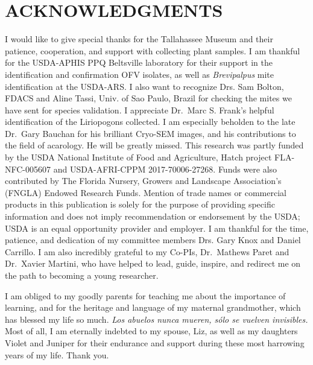 \documentclass{ufdissertation}[overrideChapters] %
\begin{document}

{\hypertarget{acknowledgments}{%
\chapter{ACKNOWLEDGMENTS}\label{acknowledgments}}

I would like to give special thanks for the Tallahassee Museum and their patience, cooperation, and support with collecting plant samples. I am thankful for the USDA-APHIS PPQ Beltsville laboratory for their support in the identification and confirmation OFV isolates, as well as \emph{Brevipalpus} mite identification at the USDA-ARS. I also want to recognize Drs. Sam Bolton, FDACS and Aline Tassi, Univ. of Sao Paulo, Brazil for checking the mites we have sent for species validation. I appreciate Dr.~Marc S. Frank's helpful identification of the Liriopogons collected. I am especially beholden to the late Dr.~Gary Bauchan for his brilliant Cryo-SEM images, and his contributions to the field of acarology. He will be greatly missed. This research was partly funded by the USDA National Institute of Food and Agriculture, Hatch project FLA-NFC-005607 and USDA-AFRI-CPPM 2017-70006-27268. Funds were also contributed by The Florida Nursery, Growers and Landscape Association's (FNGLA) Endowed Research Funds. Mention of trade names or commercial products in this publication is solely for the purpose of providing specific information and does not imply recommendation or endorsement by the USDA; USDA is an equal opportunity provider and employer. I am thankful for the time, patience, and dedication of my committee members Drs. Gary Knox and Daniel Carrillo. I am also incredibly grateful to my Co-PIs, Dr.~Mathews Paret and Dr.~Xavier Martini, who have helped to lead, guide, inspire, and redirect me on the path to becoming a young researcher.

I am obliged to my goodly parents for teaching me about the importance of learning, and for the heritage and language of my maternal grandmother, which has blessed my life so much. \emph{Los abuelos nunca mueren, sólo se vuelven invisibles.} Most of all, I am eternally indebted to my spouse, Liz, as well as my daughters Violet and Juniper for their endurance and support during these most harrowing years of my life. Thank you.}              %


\end{document}
